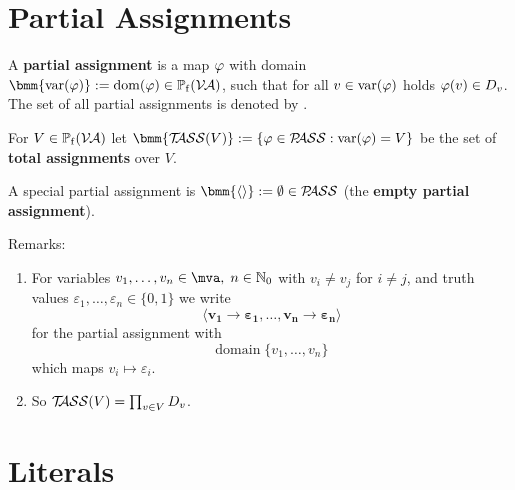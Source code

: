 \documentclass[12pt]{book}
\begin{document}
\section{Partial Assignments}
\label{sec:Partialassignments}

\begin{defi}\label{def:Pass}
  A \textbf{partial assignment} is a map $\varphi$ with domain $\bmm{\var(\vp)} := \dom(\vp) \in \pote(\Va)$, such that for all $v \in \operatorname{var}(\varphi)$ holds $\varphi(v) \in D_v$. The set of all partial assignments is denoted by \bmm{\Pass}.

 For $V \in \operatorname{\mathbb{P}_f}(\mathcal{V\hspace{-0.1em}A})$ let $\bmm{\Tass(V)} := \set{\vp \in \Pass : \var(\vp) = V}$ be the set of \textbf{total assignments} over $V$.

  A special partial assignment is $\bmm{\epa} := \es \in \Pass$ (the \textbf{empty partial assignment}).
\end{defi}
Remarks:
\begin{enumerate}
\item For variables $v_1, \ldots, v_n \in \mva, \; n\in \mathbb{N}_0$ with $v_i \neq v_j$ for $i\neq j$, and truth values $\varepsilon_1, \ldots, \varepsilon_n \in \{0,1\}$ we write
\begin{displaymath}
\pmb{\langle v_1 \to \varepsilon_1, \ldots, v_n \to \varepsilon_n\rangle}
\end{displaymath}
for the partial assignment with
\begin{displaymath}
\mbox{domain} \; \{v_1, \ldots, v_n\}
\end{displaymath}
which maps $v_i \mapsto \varepsilon_i$.



\item So $\mathcal{T\hspace{-0.35em}ASS}(V) = \prod_{v \in V} D_v$.
\end{enumerate}


\section{Literals}
\label{sec:Litsvar}
\end{document}

